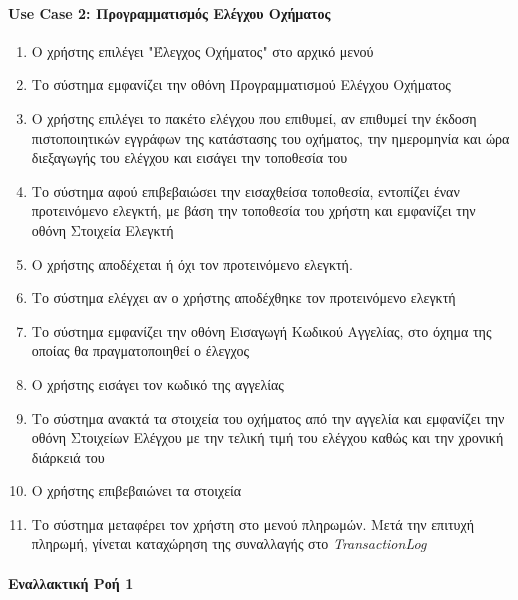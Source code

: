 \documentclass{../ol-softwaremanual}
\begin{document}
	
	\paragraph{\en Use Case 2: \gr Προγραμματισμός Ελέγχου Οχήματος}
	
	\begin{enumerate}
		\item Ο χρήστης επιλέγει \en"\gr Έλεγχος Οχήματος\en" \gr στο αρχικό μενού
		\item Το σύστημα εμφανίζει την οθόνη Προγραμματισμού Ελέγχου Οχήματος
		\item Ο χρήστης επιλέγει το πακέτο ελέγχου που επιθυμεί, αν επιθυμεί την έκδοση πιστοποιητικών εγγράφων της κατάστασης του οχήματος, την ημερομηνία και ώρα διεξαγωγής του ελέγχου και εισάγει την τοποθεσία του
		\item Το σύστημα αφού επιβεβαιώσει την εισαχθείσα τοποθεσία, εντοπίζει έναν προτεινόμενο ελεγκτή, με βάση την τοποθεσία του χρήστη και εμφανίζει την οθόνη Στοιχεία Ελεγκτή		
		\item Ο χρήστης αποδέχεται ή όχι τον προτεινόμενο ελεγκτή. 
		\item Το σύστημα ελέγχει αν ο χρήστης αποδέχθηκε τον προτεινόμενο ελεγκτή
		\item Το σύστημα εμφανίζει την οθόνη Εισαγωγή Κωδικού Αγγελίας, στο όχημα της οποίας θα πραγματοποιηθεί ο έλεγχος		
		\item Ο χρήστης εισάγει τον κωδικό της αγγελίας
		\item Το σύστημα ανακτά τα στοιχεία του οχήματος από την αγγελία και εμφανίζει την οθόνη Στοιχείων Ελέγχου με την τελική τιμή του ελέγχου καθώς και την χρονική διάρκειά του
		\item Ο χρήστης επιβεβαιώνει τα στοιχεία
		\item Το σύστημα μεταφέρει τον χρήστη στο μενού πληρωμών. Μετά την επιτυχή πληρωμή, γίνεται καταχώρηση της συναλλαγής στο \en \textit{TransactionLog} \gr
{}
	\end{enumerate}
	
	
	
	\paragraph{Εναλλακτική Ροή 1}
	
\end{document}

